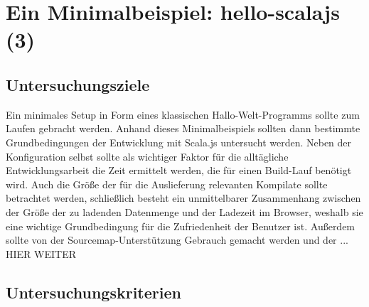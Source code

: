 \documentclass[a4paper, 12pt, hidelinks, listof=totoc, listoftables=totoc, bibliography=totoc]{scrreprt}
\begin{document}
\section{Ein Minimalbeispiel: hello-scalajs (3)}


%
%
%
%

\subsection{Untersuchungsziele}

Ein minimales Setup in Form eines klassischen Hallo-Welt-Programms sollte zum Laufen gebracht werden. Anhand dieses Minimalbeispiels sollten dann bestimmte Grundbedingungen der Entwicklung mit Scala.js untersucht werden. Neben der Konfiguration selbst sollte als wichtiger Faktor für die alltägliche Entwicklungsarbeit die Zeit ermittelt werden, die für einen Build-Lauf benötigt wird. Auch die Größe der für die Auslieferung relevanten Kompilate sollte betrachtet werden, schließlich besteht ein unmittelbarer Zusammenhang zwischen der Größe der zu ladenden Datenmenge und der Ladezeit im Browser, weshalb sie eine wichtige Grundbedingung für die Zufriedenheit der Benutzer ist.
Außerdem sollte von der Sourcemap-Unterstützung Gebrauch gemacht werden und der ... HIER WEITER

\subsection{Untersuchungskriterien}
\end{document}
